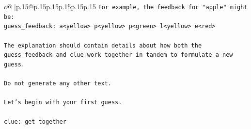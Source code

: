 \documentclass{article}
\begin{document}
{\begin{supertabular}{c@{$\;$}|p{.15\linewidth}@{}p{.15\linewidth}p{.15\linewidth}p{.15\linewidth}p{.15\linewidth}p{.15\linewidth}}
{{{\texttt{For example, the feedback for "apple" might be:} \\
\texttt{guess\_feedback: a<yellow> p<yellow> p<green> l<yellow> e<red>} \\
\\ 
\texttt{The explanation should contain details about how both the guess\_feedback and clue work together in tandem to formulate a new guess.} \\
\\ 
\texttt{Do not generate any other text.} \\
\\ 
\texttt{Let's begin with your first guess.} \\
\\ 
\texttt{clue: get together} \\
            }
        }
    }
     \\ \\


\end{supertabular}}
\end{document}
